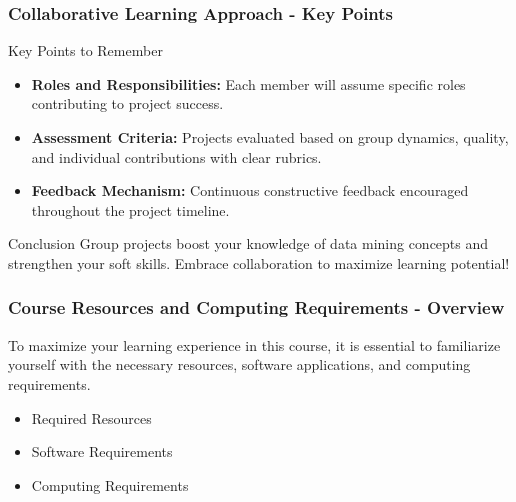 \documentclass[aspectratio=169]{beamer}
\begin{document}
\begin{frame}[fragile]
    \frametitle{Collaborative Learning Approach - Key Points}
    \begin{block}{Key Points to Remember}
        \begin{itemize}
            \item \textbf{Roles and Responsibilities:} Each member will assume specific roles contributing to project success.
            \item \textbf{Assessment Criteria:} Projects evaluated based on group dynamics, quality, and individual contributions with clear rubrics.
            \item \textbf{Feedback Mechanism:} Continuous constructive feedback encouraged throughout the project timeline.
        \end{itemize}
    \end{block}

    \begin{block}{Conclusion}
        Group projects boost your knowledge of data mining concepts and strengthen your soft skills. Embrace collaboration to maximize learning potential!
    \end{block}
\end{frame}

\begin{frame}[fragile]
    \frametitle{Course Resources and Computing Requirements - Overview}
    To maximize your learning experience in this course, it is essential to familiarize yourself with the necessary resources, software applications, and computing requirements. 
    \begin{itemize}
        \item Required Resources
        \item Software Requirements
        \item Computing Requirements
    \end{itemize}
\end{frame}
\end{document}
